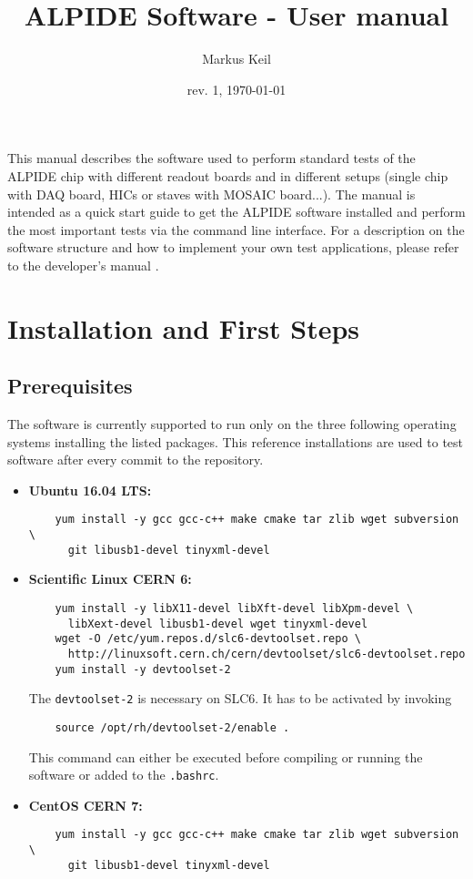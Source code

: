 \documentclass{article}
\begin{document}
\title{ALPIDE Software - User manual}
\date{rev. 1, \today}
\author{Markus Keil}
\maketitle

This manual describes the software used to perform standard tests of the ALPIDE chip with different readout boards and in different setups (single chip with DAQ board, HICs or staves with MOSAIC board...).
The manual is intended as a quick start guide to get the ALPIDE
software installed and perform the most important tests via the
command line interface. For a description on the software structure and how to implement your own test applications, please refer to the developer's manual .


\section {Installation and First Steps}
\subsection{Prerequisites}
The software is currently supported to run only on the three following operating systems installing the listed packages. This reference installations are used to test software after every commit to the repository.
\begin{itemize}
\item \textbf{Ubuntu 16.04 LTS:}
  \begin{lstlisting}
    yum install -y gcc gcc-c++ make cmake tar zlib wget subversion \
      git libusb1-devel tinyxml-devel
  \end{lstlisting}
\item \textbf{Scientific Linux CERN 6:}
  \begin{lstlisting}
    yum install -y libX11-devel libXft-devel libXpm-devel \
      libXext-devel libusb1-devel wget tinyxml-devel
    wget -O /etc/yum.repos.d/slc6-devtoolset.repo \
      http://linuxsoft.cern.ch/cern/devtoolset/slc6-devtoolset.repo
    yum install -y devtoolset-2
  \end{lstlisting}
  The \texttt{devtoolset-2} is necessary on SLC6. It has to be activated by invoking
  \begin{lstlisting}
    source /opt/rh/devtoolset-2/enable .
  \end{lstlisting}
  This command can either be executed before compiling or running the software or added to the \texttt{.bashrc}.
  \newpage
\item \textbf{CentOS CERN 7:}
  \begin{lstlisting}
    yum install -y gcc gcc-c++ make cmake tar zlib wget subversion \
      git libusb1-devel tinyxml-devel
  \end{lstlisting}
\end{itemize}
\end{document}
